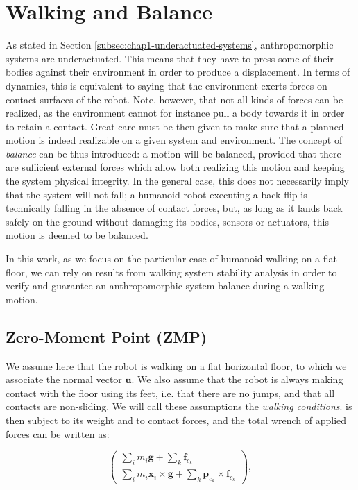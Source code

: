 \section{Walking and Balance}
\label{sec:chap1-pattern-generator}

As stated in Section \ref{subsec:chap1-underactuated-systems},
anthropomorphic systems are underactuated. This means that they have
to press some of their bodies against their environment in order to
produce a displacement. In terms of dynamics, this is equivalent to
saying that the environment exerts forces on contact surfaces of the
robot. Note, however, that not all kinds of forces can be realized, as
the environment cannot for instance pull a body towards it in order to
retain a contact. Great care must be then given to make sure that a
planned motion is indeed realizable on a given system and
environment. The concept of \emph{balance} can be thus introduced: a
motion will be balanced, provided that there are sufficient external
forces which allow both realizing this motion and keeping the system
physical integrity. In the general case, this does not necessarily
imply that the system will not fall; a humanoid robot executing a
back-flip is technically falling in the absence of contact forces,
but, as long as it lands back safely on the ground without damaging
its bodies, sensors or actuators, this motion is deemed to be
balanced.

In this work, as we focus on the particular case of humanoid walking
on a flat floor, we can rely on results from walking system stability
analysis \cite{wieber2002} in order to verify and guarantee an
anthropomorphic system balance during a walking motion.

\subsection{Zero-Moment Point (ZMP)}
\label{subsec:chap1-zmp}

We assume here that the robot {\robot} is walking on a flat horizontal
floor, to which we associate the normal vector $\mathbf{u}$. We also
assume that the robot is always making contact with the floor using
its feet, i.e. that there are no jumps, and that all contacts are
non-sliding. We will call these assumptions the \emph{walking
  conditions}. {\robot} is then subject to its weight and to contact
forces, and the total wrench of applied forces can be written as:

\begin{equation}
  \left(\begin{matrix}
    \sum_i m_i\mathbf{g}+\sum_k \mathbf{f}_{c_k} \\
    \sum_i m_i\mathbf{x}_i\times\mathbf{g}
    +\sum_k\mathbf{p}_{c_k}\times\mathbf{f}_{c_k}
  \end{matrix}\right),
\end{equation}

